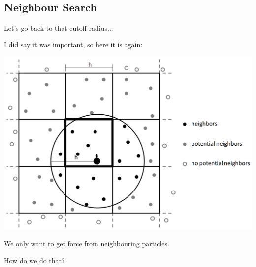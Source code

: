 \documentclass[12pt]{beamer}
\begin{document}

\subsection{Neighbour Search}

\begin{frame}{Let's go back to that cutoff radius...}
\pause 

I did say it was important\pause, so here it is again:

\begin{center}
\includegraphics[scale=0.25]{Neighbours}
\end{center}

\pause

We only want to get force from neighbouring particles. \pause 

\color{white}
How do we do that?

\end{frame}

\end{document}
